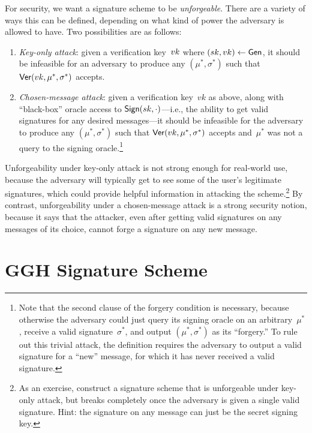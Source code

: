 \documentclass[11pt]{article}
\begin{document}
For security, we want a signature scheme to be \emph{unforgeable}.
There are a variety of ways this can be defined, depending on what
kind of power the adversary is allowed to have. Two possibilities are
as follows:
\begin{enumerate}[itemsep=0pt]
\item \emph{Key-only attack}: given a verification key~$vk$ where
  $(sk, vk) \gets \mathsf{Gen}$, it should be infeasible for an adversary
  to produce any $(\mu^*, \sigma^*)$ such that
  $\mathsf{Ver}(vk, \mu^*, \sigma^*)$ accepts.
\item \emph{Chosen-message attack}: given a verification key~$vk$ as
  above, along with ``black-box'' oracle access to
  $\mathsf{Sign}(sk, \cdot)$---i.e., the ability to get valid signatures
  for any desired messages---it should be infeasible for the adversary
  to produce any $(\mu^*, \sigma^*)$ such that
  $\mathsf{Ver}(vk, \mu^{*}, \sigma^{*})$ accepts and~$\mu^{*}$ was not a
  query to the signing oracle.\footnote{Note that the second clause of
    the forgery condition is necessary, because otherwise the
    adversary could just query its signing oracle on an
    arbitrary~$\mu^{*}$, receive a valid signature~$\sigma^{*}$, and
    output $(\mu^{*}, \sigma^{*})$ as its ``forgery.'' To rule out
    this trivial attack, the definition requires the adversary to
    output a valid signature for a ``new'' message, for which it has
    never received a valid signature.}
\end{enumerate}

Unforgeability under key-only attack is not strong enough for
real-world use, because the adversary will typically get to see some
of the user's legitimate signatures, which could provide helpful
information in attacking the scheme.\footnote{As an exercise,
  construct a signature scheme that is unforgeable under key-only
  attack, but breaks completely once the adversary is given a single
  valid signature. Hint: the signature on any message can just be the
  secret signing key.} By contrast, unforgeability under a
chosen-message attack is a strong security notion, because it says
that the attacker, even after getting valid signatures on any messages
of its choice, cannot forge a signature on any new message.

\section{GGH Signature Scheme}
\end{document}
